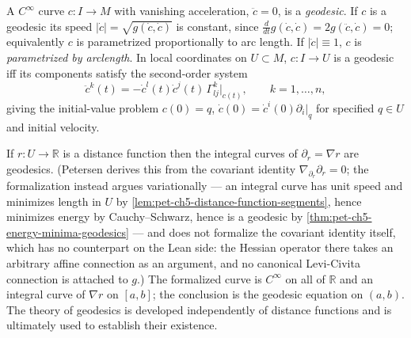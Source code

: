 \begin{definition}
  \label{def:pet-ch5-geodesic}
  \leanok
  A $C^\infty$ curve $c:I\to M$ with vanishing acceleration, $\ddot c=0$, is a
  \emph{geodesic}. If $c$ is a geodesic its speed $|\dot c|=\sqrt{g(\dot c,\dot c)}$
  is constant, since $\frac{d}{dt}g(\dot c,\dot c)=2g(\ddot c,\dot c)=0$; equivalently
  $c$ is parametrized proportionally to arc length. If $|\dot c|\equiv1$, $c$ is
  \emph{parametrized by arclength}. In local coordinates on $U\subset M$, $c:I\to U$
  is a geodesic iff its components satisfy the second-order system
  \[
    \ddot c^k(t)=-\dot c^l(t)\dot c^j(t)\,\Gamma^k_{lj}|_{c(t)},\qquad k=1,\dots,n,
  \]
  giving the initial-value problem $c(0)=q$, $\dot c(0)=\dot c^i(0)\partial_i|_q$ for
  specified $q\in U$ and initial velocity.
\end{definition}

\begin{remark}
  \label{rem:pet-ch5-distance-function-geodesics}
  \leanok
  If $r:U\to\mathbb R$ is a distance function then the integral curves of
  $\partial_r=\nabla r$ are geodesics.  (Petersen derives this from the covariant
  identity $\nabla_{\partial_r}\partial_r=0$; the formalization instead argues
  variationally — an integral curve has unit speed and minimizes length in $U$ by
  \cref{lem:pet-ch5-distance-function-segments}, hence minimizes energy by
  Cauchy–Schwarz, hence is a geodesic by
  \cref{thm:pet-ch5-energy-minima-geodesics} — and does not formalize the
  covariant identity itself, which has no counterpart on the Lean side: the
  Hessian operator there takes an arbitrary affine connection as an argument, and
  no canonical Levi-Civita connection is attached to $g$.)  The formalized curve
  is $C^\infty$ on all of $\mathbb R$ and an integral curve of $\nabla r$ on
  $[a,b]$; the conclusion is the geodesic equation on $(a,b)$.
  The theory of geodesics is developed independently of distance functions and is
  ultimately used to establish their existence.
\end{remark}

